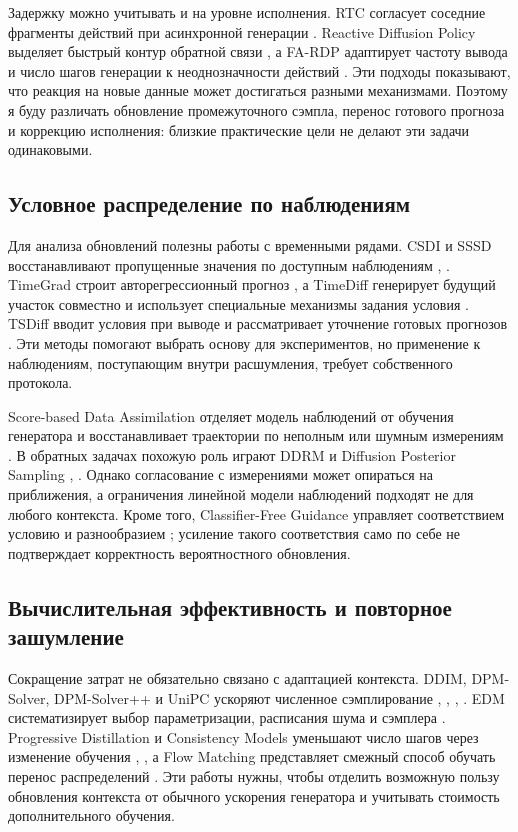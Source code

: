 \documentclass{article}
\begin{document}
Задержку можно учитывать и на уровне исполнения. RTC согласует соседние фрагменты действий при асинхронной генерации \citep{p06}. Reactive Diffusion Policy выделяет быстрый контур обратной связи \citep{p07}, а FA-RDP адаптирует частоту вывода и число шагов генерации к неоднозначности действий \citep{p08}. Эти подходы показывают, что реакция на новые данные может достигаться разными механизмами. Поэтому я буду различать обновление промежуточного сэмпла, перенос готового прогноза и коррекцию исполнения: близкие практические цели не делают эти задачи одинаковыми.

\subsection{Условное распределение по наблюдениям}

Для анализа обновлений полезны работы с временными рядами. CSDI и SSSD восстанавливают пропущенные значения по доступным наблюдениям \citep{p19}, \citep{p23}. TimeGrad строит авторегрессионный прогноз \citep{p20}, а TimeDiff генерирует будущий участок совместно и использует специальные механизмы задания условия \citep{p21}. TSDiff вводит условия при выводе и рассматривает уточнение готовых прогнозов \citep{p24}. Эти методы помогают выбрать основу для экспериментов, но применение к наблюдениям, поступающим внутри расшумления, требует собственного протокола.

Score-based Data Assimilation отделяет модель наблюдений от обучения генератора и восстанавливает траектории по неполным или шумным измерениям \citep{p22}. В обратных задачах похожую роль играют DDRM и Diffusion Posterior Sampling \citep{p29}, \citep{p28}. Однако согласование с измерениями может опираться на приближения, а ограничения линейной модели наблюдений подходят не для любого контекста. Кроме того, Classifier-Free Guidance управляет соответствием условию и разнообразием \citep{p40}; усиление такого соответствия само по себе не подтверждает корректность вероятностного обновления.

\subsection{Вычислительная эффективность и повторное зашумление}

Сокращение затрат не обязательно связано с адаптацией контекста. DDIM, DPM-Solver, DPM-Solver++ и UniPC ускоряют численное сэмплирование \citep{p30}, \citep{p31}, \citep{p32}, \citep{p33}. EDM систематизирует выбор параметризации, расписания шума и сэмплера \citep{p36}. Progressive Distillation и Consistency Models уменьшают число шагов через изменение обучения \citep{p35}, \citep{p34}, а Flow Matching представляет смежный способ обучать перенос распределений \citep{p39}. Эти работы нужны, чтобы отделить возможную пользу обновления контекста от обычного ускорения генератора и учитывать стоимость дополнительного обучения.
\end{document}
